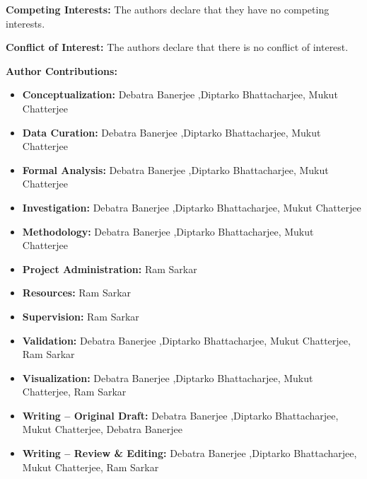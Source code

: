 \documentclass[preprint,12pt]{elsarticle}
\begin{document}
\medskip
\noindent\textbf{Competing Interests:} The authors declare that they have no competing interests.

\medskip
\noindent\textbf{Conflict of Interest:} The authors declare that there is no conflict of interest.

\medskip
\textbf{Author Contributions:}

\begin{itemize}
    \item \textbf{Conceptualization:} Debatra Banerjee ,Diptarko Bhattacharjee, Mukut Chatterjee
    \item \textbf{Data Curation:} Debatra Banerjee ,Diptarko Bhattacharjee, Mukut Chatterjee
    \item \textbf{Formal Analysis:} Debatra Banerjee ,Diptarko Bhattacharjee, Mukut Chatterjee
    \item \textbf{Investigation:} Debatra Banerjee ,Diptarko Bhattacharjee, Mukut Chatterjee
    \item \textbf{Methodology:} Debatra Banerjee ,Diptarko Bhattacharjee, Mukut Chatterjee
    \item \textbf{Project Administration:} Ram Sarkar
    \item \textbf{Resources:} Ram Sarkar
    \item \textbf{Supervision:} Ram Sarkar
    \item \textbf{Validation:} Debatra Banerjee ,Diptarko Bhattacharjee, Mukut Chatterjee, Ram Sarkar
    \item \textbf{Visualization:} Debatra Banerjee ,Diptarko Bhattacharjee, Mukut Chatterjee, Ram Sarkar
    \item \textbf{Writing -- Original Draft:} Debatra Banerjee ,Diptarko Bhattacharjee, Mukut Chatterjee, Debatra Banerjee
    \item \textbf{Writing -- Review \& Editing:} Debatra Banerjee ,Diptarko Bhattacharjee, Mukut Chatterjee, Ram Sarkar
\end{itemize}
\end{document}
